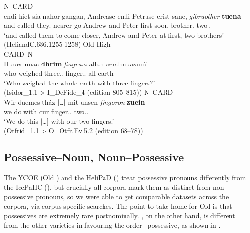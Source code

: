 \documentclass[output=paper,colorlinks,citecolor=brown,draft]{langscibook}
\begin{document}
\ex\label{OSNCard}
N--CARD\\
\gll endi hiet sia nahor gangan, Andrease endi Petruse erist sane, \textit{gibruother} \textbf{tuena}\\
and called they.\ACC{} nearer go Andrew and Peter first soon brother\ACC.\PL{} two.\ACC.\PL{}\\
\glt ‘and called them to come closer, Andrew and Peter at first, two brothers’ (HeliandC.686.1255-1258)
\z
\ex\label{OHGCardN}
\noindent Old High \\
\ea CARD--N\\
\gll Huuer uuac \textbf{dhrim} \textit{fingrum} allan aerdhuuasun?\\
who weighed three.\DAT.\PL{} finger.\DAT.\PL{} all earth\\
\glt ‘Who weighed the whole earth with three fingers?’\\
(Isidor\_1.1 > I\_DeFide\_4 (edition 805--815))
\ex\label{OHGNCard}
N--CARD\\
\gll Wir duemes tház […] mit unsen \textit{fíngoron} \textbf{zuein}\\
we do \DEM{} {} with our finger.\DAT.\PL{} two.\DAT.\PL{}\\
\glt ‘We do this […] with our two fingers.’\\
(Otfrid\_1.1 > O\_Otfr.Ev.5.2 (edition 68--78))
\z
\z

\subsection{Possessive–Noun, Noun–Possessive}\label{ssectPosNNPos}

The YCOE  (Old ) and the HeliPaD  () treat possessive pronouns differently from the IcePaHC  (), but crucially all corpora mark them as distinct from non-possessive pronouns, so we were able to get comparable datasets across the corpora, via corpus-specific searches. The point to take home for Old  is that possessives are extremely rare postnominally. , on the other hand, is different from the other varieties in favouring the order –possessive, as shown in .\largerpage
\end{document}
